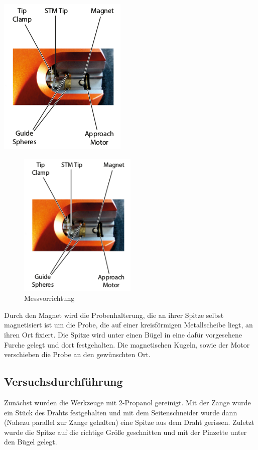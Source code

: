 \includegraphics{Aufbau2.png}
\begin{figure}
	\centering
		\includegraphics[width=0.5\textwidth]{Aufbau2}
	\caption{Messvorrichtung}
	\label{fig:Aufbau2}
\end{figure}

\noindent Durch den Magnet wird die Probenhalterung, die an ihrer Spitze selbst magnetisiert ist um die Probe, die auf einer kreisförmigen Metallscheibe liegt, an ihren Ort fixiert. Die Spitze wird unter einen Bügel in eine dafür vorgesehene Furche gelegt und dort festgehalten. Die magnetischen Kugeln, sowie der Motor verschieben die Probe an den gewünschten Ort.

\subsection{Versuchsdurchführung}
Zunächst wurden die Werkzeuge mit 2-Propanol gereinigt. Mit der Zange wurde ein Stück des Drahts festgehalten und mit dem Seitenschneider wurde dann (Nahezu parallel zur Zange gehalten) eine Spitze aus dem Draht gerissen. Zuletzt wurde die Spitze auf die richtige Größe geschnitten und mit der Pinzette unter den Bügel gelegt.

